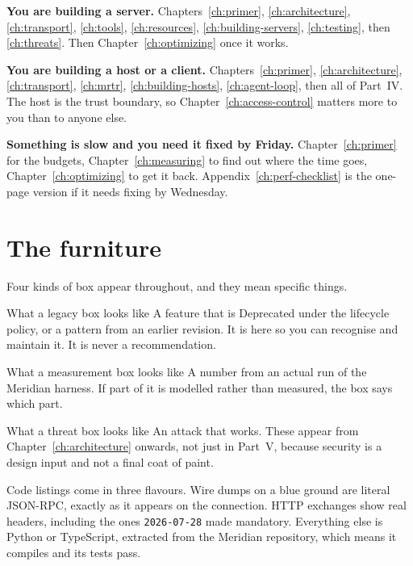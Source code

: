 \textbf{You are building a server.} Chapters~\ref{ch:primer},
\ref{ch:architecture}, \ref{ch:transport}, \ref{ch:tools}, \ref{ch:resources},
\ref{ch:building-servers}, \ref{ch:testing}, then \ref{ch:threats}. Then
Chapter~\ref{ch:optimizing} once it works.

\textbf{You are building a host or a client.} Chapters~\ref{ch:primer},
\ref{ch:architecture}, \ref{ch:transport}, \ref{ch:mrtr},
\ref{ch:building-hosts}, \ref{ch:agent-loop}, then all of Part~IV. The host is
the trust boundary, so Chapter~\ref{ch:access-control} matters more to you than
to anyone else.

\textbf{Something is slow and you need it fixed by Friday.}
Chapter~\ref{ch:primer} for the budgets, Chapter~\ref{ch:measuring} to find out
where the time goes, Chapter~\ref{ch:optimizing} to get it back.
Appendix~\ref{ch:perf-checklist} is the one-page version if it needs fixing by
Wednesday.

\section*{The furniture}

Four kinds of box appear throughout, and they mean specific things.

\begin{legacybox}{What a legacy box looks like}
A feature that is Deprecated under the lifecycle policy, or a pattern from an
earlier revision. It is here so you can recognise and maintain it. It is never
a recommendation.
\end{legacybox}

\begin{measurebox}{What a measurement box looks like}
A number from an actual run of the Meridian harness. If part of it is modelled
rather than measured, the box says which part.
\end{measurebox}

\begin{dangerbox}{What a threat box looks like}
An attack that works. These appear from Chapter~\ref{ch:architecture} onwards,
not just in Part~V, because security is a design input and not a final coat of
paint.
\end{dangerbox}


Code listings come in three flavours. Wire dumps on a blue ground are literal
JSON-RPC, exactly as it appears on the connection. HTTP exchanges show real
headers, including the ones \texttt{2026-07-28} made mandatory. Everything else
is Python or TypeScript, extracted from the Meridian repository, which means it
compiles and its tests pass.

